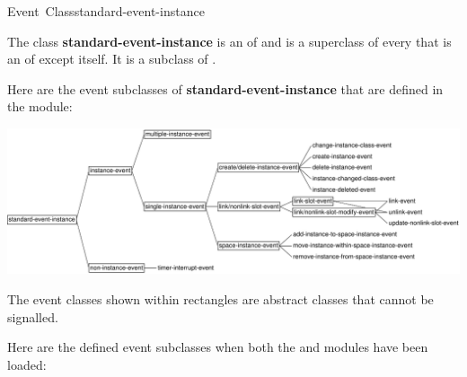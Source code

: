 \documentclass[10pt,twoside,english,pdftex]{article}
\begin{document}

\begin{functiondoc}{Event~Class}{standard-event-instance}{}
%
%
  
\fnsyntax

\fnpackage {}

\fnmodule {}

\fndescription 
{}%
The class \textbf{standard-event-instance} is an  of
\textbf{} and is a superclass of every
 that is an  of
\textbf{} except itself.  It is a subclass
of \textbf{}.

%
Here are the event subclasses of \textbf{standard-event-instance}
that are defined in the  
module:

\T\begin{ifhtml}
\T\end{ifhtml}
\W\begin{iftex} 
\begin{center}
\includegraphics[scale=0.85]{gbbopen-events}
\end{center}
\W\end{iftex}

\noindent The event classes shown within rectangles are abstract classes
that cannot be signalled.

\W{}

Here are the defined event subclasses when both the
 and  modules have been loaded:


\end{functiondoc}
\end{document}
